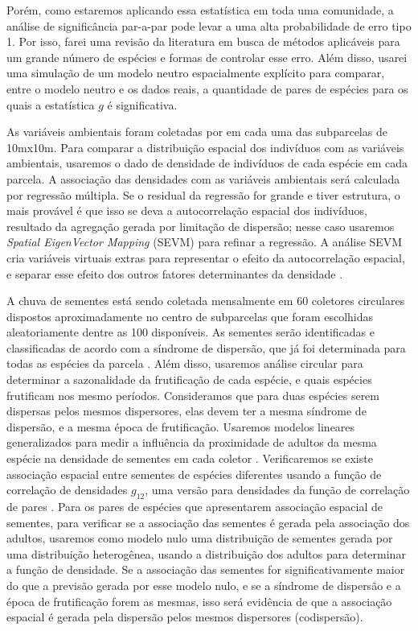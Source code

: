 \documentclass[twoside,12pt,a4paper]{report}
\begin{document}
Porém, como estaremos aplicando essa estatística em toda uma
comunidade, a análise de significância par-a-par pode levar a uma alta probabilidade de erro tipo 1.
Por isso, farei uma revisão da literatura em busca de métodos aplicáveis para um grande número de
espécies e formas de controlar esse erro. Além disso, usarei uma simulação de um modelo neutro
espacialmente explícito para comparar, entre o modelo neutro e os dados reais, a quantidade de pares de espécies para os quais a estatística
$g$ é significativa.

As variáveis ambientais foram coletadas por \cite{Kelly} em cada uma das subparcelas de 10mx10m.
Para comparar a distribuição espacial dos indivíduos com as variáveis ambientais, usaremos o dado de
densidade de indivíduos de cada espécie em cada parcela. 
A associação das densidades com as variáveis ambientais será calculada por regressão
múltipla. Se o residual da regressão for grande e tiver estrutura, o mais provável é que isso
se deva a autocorrelação espacial dos indivíduos, resultado da agregação gerada por limitação
de dispersão; nesse caso usaremos {\em Spatial
EigenVector Mapping} (SEVM) para refinar a regressão. A análise SEVM cria variáveis virtuais
extras para representar o efeito da autocorrelação espacial, e separar esse efeito dos outros
fatores determinantes da densidade \citep{Dormann2007methods}.

A chuva de sementes está sendo coletada mensalmente em 60 coletores circulares dispostos
aproximadamente no centro de subparcelas que foram escolhidas aleatoriamente dentre as 100
disponíveis. As sementes serão identificadas e classificadas de acordo com a síndrome de
dispersão, que já foi determinada para todas as espécies da parcela \citep{martins2014}.
Além disso, usaremos análise circular para determinar a sazonalidade da frutificação de cada
espécie, e quais espécies frutificam nos mesmo períodos. Consideramos que para duas espécies
serem dispersas pelos mesmos dispersores, elas devem ter a mesma síndrome de dispersão, e a
mesma época de frutificação.
Usaremos modelos lineares generalizados para medir a influência da proximidade de adultos da mesma
espécie na densidade de sementes em cada coletor \citep{Hardesty2002}. 
Verificaremos se existe associação espacial entre sementes de espécies diferentes usando a
função de correlação de densidades $g_{12}$, uma versão para densidades da função de
correlação de pares \citep{Fedriani2015}. 
Para os pares de espécies que apresentarem associação espacial de sementes, para verificar se
a associação das sementes é gerada pela associação dos adultos, usaremos
como modelo nulo uma distribuição de sementes gerada por uma distribuição heterogênea, usando
a distribuição dos adultos para determinar a função de densidade.
Se a associação das sementes for significativamente maior do que a previsão gerada por esse modelo nulo,
e se a síndrome de dispersão e a época de frutificação forem as mesmas, isso será evidência
de que a associação espacial é gerada pela dispersão pelos mesmos dispersores (codispersão).
\end{document}
